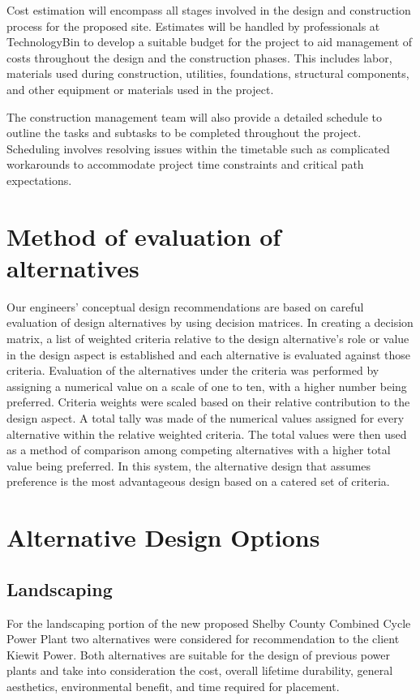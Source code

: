\documentclass{ceri}
\begin{document}
Cost estimation will encompass all stages involved in the design and construction process for the proposed site. Estimates will be handled by professionals at TechnologyBin to develop a suitable budget for the project to aid management of costs throughout the design and the construction phases. This includes labor, materials used during construction, utilities, foundations, structural components, and other equipment or materials used in the project.\\
\newline

The construction management team will also provide a detailed schedule to outline the tasks and subtasks to be completed throughout the project. Scheduling involves resolving issues within the timetable such as complicated workarounds to accommodate project time constraints and critical path expectations.
\section{Method of evaluation of alternatives}
Our engineers’ conceptual design recommendations are based on careful evaluation of design alternatives by using decision matrices. In creating a decision matrix, a list of weighted criteria relative to the design alternative’s role or value in the design aspect is established and each alternative is evaluated against those criteria. Evaluation of the alternatives under the criteria was performed by assigning a numerical value on a scale of one to ten, with a higher number being preferred. Criteria weights were scaled based on their relative contribution to the design aspect. A total tally was made of the numerical values assigned for every alternative within the relative weighted criteria. The total values were then used as a method of comparison among competing alternatives with a higher total value being preferred. In this system, the alternative design that assumes preference is the most advantageous design based on a catered set of criteria.  
\newpage

\section{Alternative Design Options}

\subsection{Landscaping}
For the landscaping portion of the new proposed Shelby County Combined Cycle Power Plant two alternatives were considered for recommendation to the client Kiewit Power. Both alternatives are suitable for the design of previous power plants and take into consideration the cost, overall lifetime durability, general aesthetics, environmental benefit, and time required for placement.
\end{document}
